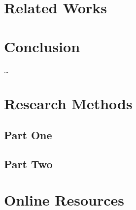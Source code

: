 \documentclass[acmtog]{acmart}
\begin{document}
	\section{Related Works}
	\section{Conclusion}


	

	





\begin{acks}
	\ldots
\end{acks}





\appendix

\section{Research Methods}

\subsection{Part One}



\subsection{Part Two}



\section{Online Resources}
\end{document}
